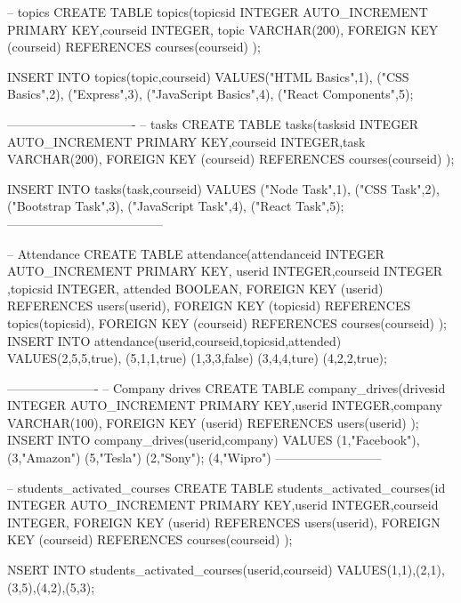 -- topics
CREATE TABLE topics(topicsid INTEGER AUTO_INCREMENT PRIMARY KEY,courseid INTEGER, topic VARCHAR(200),
FOREIGN KEY (courseid) REFERENCES courses(courseid)
);

INSERT INTO topics(topic,courseid) VALUES("HTML Basics",1),
                                         ("CSS Basics",2),
                                         ("Express",3),
                                         ("JavaScript Basics",4),
                                         ("React Components",5);


-------------------------------
-- tasks
CREATE TABLE tasks(tasksid INTEGER AUTO_INCREMENT PRIMARY KEY,courseid INTEGER,task VARCHAR(200),
FOREIGN KEY (courseid) REFERENCES courses(courseid)
);

INSERT INTO tasks(task,courseid) VALUES ("Node Task",1),
                                         ("CSS Task",2),
                                         ("Bootstrap Task",3),
                                         ("JavaScript Task",4),
                                         ("React Task",5);
--------------------------------------

-- Attendance
CREATE TABLE attendance(attendanceid INTEGER AUTO_INCREMENT PRIMARY KEY, userid INTEGER,courseid INTEGER ,topicsid INTEGER, attended BOOLEAN,
FOREIGN KEY (userid) REFERENCES users(userid),
FOREIGN KEY (topicsid) REFERENCES topics(topicsid),
FOREIGN KEY (courseid) REFERENCES courses(courseid)
);
INSERT INTO attendance(userid,courseid,topicsid,attended) VALUES(2,5,5,true),
                                                                (5,1,1,true)
                                                                (1,3,3,false)
                                                                (3,4,4,ture)
                                                                (4,2,2,true);

----------------------
-- Company drives
CREATE TABLE company_drives(drivesid INTEGER AUTO_INCREMENT PRIMARY KEY,userid INTEGER,company VARCHAR(100),
FOREIGN KEY (userid) REFERENCES users(userid)
);
INSERT INTO company_drives(userid,company) VALUES (1,"Facebook"),
                                                    (3,"Amazon")
                                                    (5,"Tesla")
                                                    (2,"Sony");
                                                    (4,"Wipro")
--------------------------

-- students_activated_courses
CREATE TABLE students_activated_courses(id INTEGER AUTO_INCREMENT PRIMARY KEY,userid INTEGER,courseid INTEGER,
FOREIGN KEY (userid) REFERENCES users(userid),
FOREIGN KEY (courseid) REFERENCES courses(courseid)
);

NSERT INTO students_activated_courses(userid,courseid) VALUES(1,1),(2,1),(3,5),(4,2),(5,3);